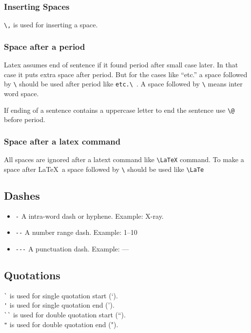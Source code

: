 \documentclass[11pt]{article}
\begin{document}
\subsubsection{Inserting Spaces}

\verb=\,= is used for inserting a space.

\subsubsection{Space after a period}

Latex assumes end of sentence if it found period after small case later. In that case it puts extra space after period. But for the cases like ``etc.'' a space followed by \verb=\= should be used after period like \verb=etc.\ =. A space followed by \verb=\=  means inter word space.

If ending of a sentence contains a uppercase letter to end the sentence use \verb=\@= before period.

\subsubsection{Space after a latex command}

All spaces are ignored after a latext command like \verb=\LaTeX= command. To make a space after \LaTeX\ a space followed by \verb=\= should be used like \verb=\LaTe= 

\subsection{Dashes}

\begin{itemize}
		\item\verb=-= A intra-word dash or hyphene. Example: X-ray.
		\item\verb=--= A number range dash. Example: 1--10
		\item\verb=---= A punctuation dash. Example: ---
\end{itemize}

\subsection{Quotations}

\verb=`= is used for single quotation start (`).\\
\verb='= is used for single quotation end (').\\
\verb=``= is used for double quotation start (``).\\
\verb="= is used for double quotation end (").
\end{document}
